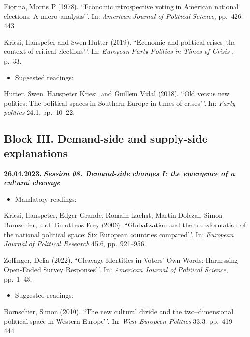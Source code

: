 \documentclass[
  12pt,
]{article}
\providecommand{\tightlist}{%
  \setlength{\itemsep}{0pt}\setlength{\parskip}{0pt}}
\begin{document}
Fiorina, Morris P (1978). ``Economic retrospective voting in American
national elections: A micro--analysis'\,'. In:
\emph{American Journal of Political Science}, pp.~426--443.

Kriesi, Hanspeter and Swen Hutter (2019). ``Economic and political
crises--the context of critical elections'\,'. In:
\emph{European Party Politics in Times of Crisis} , p.~33.

\begin{itemize}
\tightlist
\item
  Suggested readings:
\end{itemize}

Hutter, Swen, Hanspeter Kriesi, and Guillem Vidal (2018). ``Old versus
new politics: The political spaces in Southern Europe in times of
crises'\,'. In: \emph{Party politics} 24.1, pp.~10--22.

\hypertarget{block-iii.-demand-side-and-supply-side-explanations}{%
\subsection{Block III. Demand-side and supply-side
explanations}\label{block-iii.-demand-side-and-supply-side-explanations}}

\textbf{26.04.2023.} \textbf{\emph{Session 08. Demand-side changes I:
the emergence of a cultural cleavage}}

\begin{itemize}
\tightlist
\item
  Mandatory readings:
\end{itemize}

Kriesi, Hanspeter, Edgar Grande, Romain Lachat, Martin Dolezal, Simon
Bornschier, and Timotheos Frey (2006). ``Globalization and the
transformation of the national political space: Six European countries
compared'\,'. In: \emph{European Journal of Political Research} 45.6,
pp.~921--956.

Zollinger, Delia (2022). ``Cleavage Identities in Voters' Own Words:
Harnessing Open-Ended Survey Responses'\,'. In:
\emph{American Journal of Political Science}, pp.~1--48.

\begin{itemize}
\tightlist
\item
  Suggested readings:
\end{itemize}

Bornschier, Simon (2010). ``The new cultural divide and the
two--dimensional political space in Western Europe'\,'. In:
\emph{West European Politics} 33.3, pp.~419--444.
\end{document}
